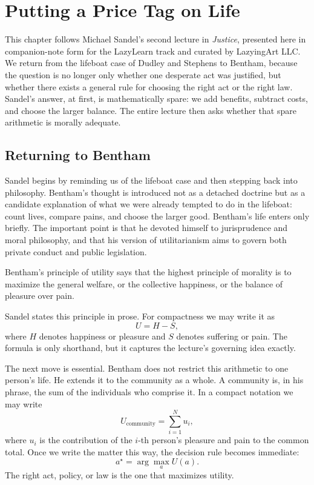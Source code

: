 \chapter{Putting a Price Tag on Life}

This chapter follows Michael Sandel's second lecture in \emph{Justice}, presented here in companion-note form for the LazyLearn track and curated by LazyingArt LLC. We return from the lifeboat case of Dudley and Stephens to Bentham, because the question is no longer only whether one desperate act was justified, but whether there exists a general rule for choosing the right act or the right law. Sandel's answer, at first, is mathematically spare: we add benefits, subtract costs, and choose the larger balance. The entire lecture then asks whether that spare arithmetic is morally adequate.

\section{Returning to Bentham}

Sandel begins by reminding us of the lifeboat case and then stepping back into philosophy. Bentham's thought is introduced not as a detached doctrine but as a candidate explanation of what we were already tempted to do in the lifeboat: count lives, compare pains, and choose the larger good. Bentham's life enters only briefly. The important point is that he devoted himself to jurisprudence and moral philosophy, and that his version of utilitarianism aims to govern both private conduct and public legislation.

\begin{definition}
Bentham's principle of utility says that the highest principle of morality is to maximize the general welfare, or the collective happiness, or the balance of pleasure over pain.
\end{definition}

Sandel states this principle in prose. For compactness we may write it as
\begin{equation}
U = H - S,
\end{equation}
where \(H\) denotes happiness or pleasure and \(S\) denotes suffering or pain. The formula is only shorthand, but it captures the lecture's governing idea exactly.

The next move is essential. Bentham does not restrict this arithmetic to one person's life. He extends it to the community as a whole. A community is, in his phrase, the sum of the individuals who comprise it. In a compact notation we may write
\begin{equation}
U_{\text{community}}=\sum_{i=1}^{N} u_i,
\end{equation}
where \(u_i\) is the contribution of the \(i\)-th person's pleasure and pain to the common total. Once we write the matter this way, the decision rule becomes immediate:
\begin{equation}
a^\star=\arg\max_a U(a).
\end{equation}
The right act, policy, or law is the one that maximizes utility.

